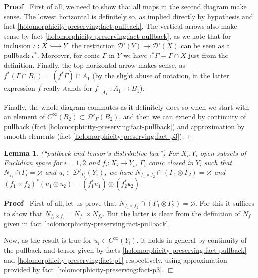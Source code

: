 \documentclass{article}
\newcommand*{\longhookrightarrow}{\ensuremath{\lhook\joinrel\relbar\joinrel\rightarrow}}
\renewenvironment{proof}{\noindent\textbf{Proof\ }}{\hspace*{\fill}$\Box$\medskip}
\newtheorem{lemma}[proposition]{Lemma}
\theoremstyle{remark}
\begin{document}
\begin{proof}
  First of all, we need to show that all maps in the second diagram make
  sense. The lowest horizontal is definitely so, as implied directly by
  hypothesis and fact \ref{holomorphicity-preserving:fact-pullback}. The
  vertical arrows also make sense by fact
  \ref{holomorphicity-preserving:fact-pullback}, as we note that for inclusion
  $\iota : X \longhookrightarrow Y$ the restriction $\mathcal{D}' (Y)
  \rightarrow \mathcal{D}' (X)$ can be seen as a pullback $\iota^{\ast}$.
  Moreover, for conic $\Gamma$ in $Y$ we have $\iota^{\ast} \Gamma = \Gamma
  \cap X$ just from the definition. Finally, the top horizontal arrow makes
  sense, as $f^{\ast} (\Gamma \cap B_1) = (f^{\ast} \Gamma) \cap A_1$ (by the
  slight abuse of notation, in the latter expression $f$ really stands for $f
  \mid_{A_1} : A_1 \rightarrow B_1$).
  
  Finally, the whole diagram commutes as it definitely does so when we start
  with an element of $C^{\infty} (B_2) \subset \mathcal{D}'_{\Gamma} (B_2)$,
  and then we can extend by continuity of pullback (fact
  \ref{holomorphicity-preserving:fact-pullback}) and approximation by smooth
  elements (fact \ref{holomorphicity-preserving:fact-p3}).
\end{proof}

\begin{lemma}
  \label{KR-normalization-recur:lem-pull-distrib-tensor}(``pullback and
  tensor's distributive law'') For $X_i, Y_i$ open subsets of Euclidian space
  for $i = 1, 2$ and $f_i : X_i \rightarrow Y_i$, $\Gamma_i$ conic closed in
  $Y_i$ such that $N_{f_i} \cap \Gamma_i = \varnothing$ and $u_i \in
  \mathcal{D}'_{\Gamma_i} (Y_i)$, we have $N_{f_1 \times f_2} \cap (\Gamma_1
  \otimes \Gamma_2) = \varnothing$ and $(f_1 \times f_2)^{\ast} (u_1 \otimes
  u_2) = (f_1^{\ast} u_1) \otimes (f_2^{\ast} u_2)$.
\end{lemma}

\begin{proof}
  First of all, let us prove that $N_{f_1 \times f_2} \cap (\Gamma_1 \otimes
  \Gamma_2) = \varnothing$. For this it suffices to show that $N_{f_1 \times
  f_2} = N_{f_1} \times N_{f_2}$. But the latter is clear from the definition
  of $N_f$ given in fact \ref{holomorphicity-preserving:fact-pullback}.
  
  Now, as the result is true for $u_i \in C^{\infty} (Y_i)$, it holds in
  general by continuity of the pullback and tensor given by facts
  \ref{holomorphicity-preserving:fact-pullback} and
  \ref{holomorphicity-preserving:fact-p1} respectively, using approximation
  provided by fact \ref{holomorphicity-preserving:fact-p3}.
\end{proof}
\end{document}
